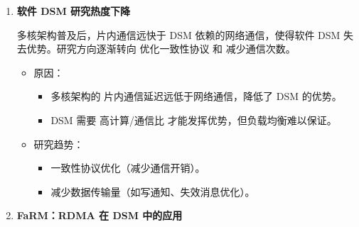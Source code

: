 {\begin{enumerate}[leftmargin=1em, align=left]
          JIAJIA 采用 域一致性（SC），比 LRC 更宽松，仅同步锁保护区域的修改。其 基于锁的缓存一致性协议 用锁存储写通知，而非目录，减少管理复杂性，提升可扩展性。

          \begin{itemize}
            \item 域一致性（SC）：限定一致性传播范围，仅同步锁保护的数据区域。
            \item 基于锁的缓存一致性：锁存储写通知，避免目录管理的开销。
            \item 对比：
                  \begin{itemize}
                    \item  IVY：顺序一致性，开销较高。
                    \item Munin：释放一致性，优化通信量，但仍有目录管理。
                    \item JIAJIA：基于锁的一致性，进一步降低通信开销，提高可扩展性。
                  \end{itemize}
          \end{itemize}
    \item \textbf{软件 DSM 研究热度下降}

          多核架构普及后，片内通信远快于 DSM 依赖的网络通信，使得软件 DSM 失去优势。研究方向逐渐转向 优化一致性协议 和 减少通信次数\citep{Cheung1999AMP, abe2003movinghomedsm}。

          \begin{itemize}
            \item 原因：
                  \begin{itemize}
                    \item 多核架构的 片内通信延迟远低于网络通信，降低了 DSM 的优势。
                    \item DSM 需要 高计算/通信比 才能发挥优势，但负载均衡难以保证。
                  \end{itemize}
            \item 研究趋势：
                  \begin{itemize}
                    \item 一致性协议优化（减少通信开销）。
                    \item 减少数据传输量（如写通知、失效消息优化）。
                  \end{itemize}
          \end{itemize}

    \item \textbf{FaRM：RDMA 在 DSM 中的应用}


\end{enumerate}}
